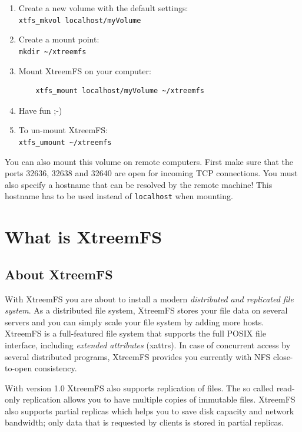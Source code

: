 \documentclass[a4paper,10pt]{book}
\begin{document}
\begin{enumerate}
\item Create a new volume with the default settings:\\
	\texttt{xtfs\_mkvol localhost/myVolume}

\item Create a mount point:\\
	\texttt{mkdir \~{}/xtreemfs}

\item Mount XtreemFS on your computer:
	\begin{verbatim}
	xtfs_mount localhost/myVolume ~/xtreemfs
	\end{verbatim}


\item Have fun ;-)

\item To un-mount XtreemFS:\\
	\texttt{xtfs\_umount \~{}/xtreemfs}
\end{enumerate}

You can also mount this volume on remote computers. First make sure that the ports 32636, 32638 and 32640 are open for incoming TCP connections. You must also specify a hostname that can be resolved by the remote machine! This hostname has to be used instead of \texttt{localhost} when mounting.

\chapter{What is XtreemFS}
\setcounter{page}{1}

\section{About XtreemFS}

With XtreemFS you are about to install a modern \emph{distributed and replicated file system}. As a distributed file system, XtreemFS stores your file data on several servers and you can simply scale your file system by adding more hosts. XtreemFS is a full-featured file system that supports the full POSIX file interface, including \emph{extended attributes} (xattrs). In case of concurrent access by several distributed programs, XtreemFS provides you currently with NFS close-to-open consistency.

With version 1.0 XtreemFS also supports replication of files. The so called read-only replication allows you to have multiple copies of immutable files. XtreemFS also supports partial replicas which helps you to save disk capacity and network bandwidth; only data that is requested by clients is stored in partial replicas.
\end{document}
